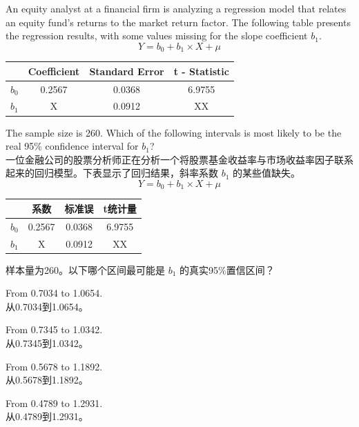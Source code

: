 \documentclass{article}
\newcounter{question} %
\begin{document}
\begin{question}
    An equity analyst at a financial firm is analyzing a regression model that relates an equity fund's returns to the market return factor. The following table presents the regression results, with some values missing for the slope coefficient \(b_1\). 
    \[
    Y = b_0 + b_1 \times X + \mu
    \]
    \begin{center}
    \begin{tabular}{cccc}
    \hline
        & Coefficient & Standard Error & t - Statistic \\
    \hline
    $b_0$ & 0.2567 & 0.0368 & 6.9755 \\
    $b_1$ & X & 0.0912 & XX \\
    \hline
    \end{tabular}
    \end{center}
    The sample size is 260. Which of the following intervals is most likely to be the real 95\% confidence interval for $b_1$?\\
    一位金融公司的股票分析师正在分析一个将股票基金收益率与市场收益率因子联系起来的回归模型。下表显示了回归结果，斜率系数 \(b_1\) 的某些值缺失。
    \[
    Y = b_0 + b_1 \times X + \mu
    \]
    \begin{center}
    \begin{tabular}{cccc}
    \hline
        & 系数 & 标准误 & t统计量 \\
    \hline
    $b_0$ & 0.2567 & 0.0368 & 6.9755 \\
    $b_1$ & X & 0.0912 & XX \\
    \hline
    \end{tabular}
    \end{center}
    样本量为260。以下哪个区间最可能是 $b_1$ 的真实95\%置信区间？
    \end{question}
    
    \begin{choices}
        \item From 0.7034 to 1.0654.\\
        从0.7034到1.0654。
        \item From 0.7345 to 1.0342.\\
        从0.7345到1.0342。
        \item From 0.5678 to 1.1892.\\
        从0.5678到1.1892。
        \item From 0.4789 to 1.2931.\\
        从0.4789到1.2931。
    \end{choices}
    
\end{document}
